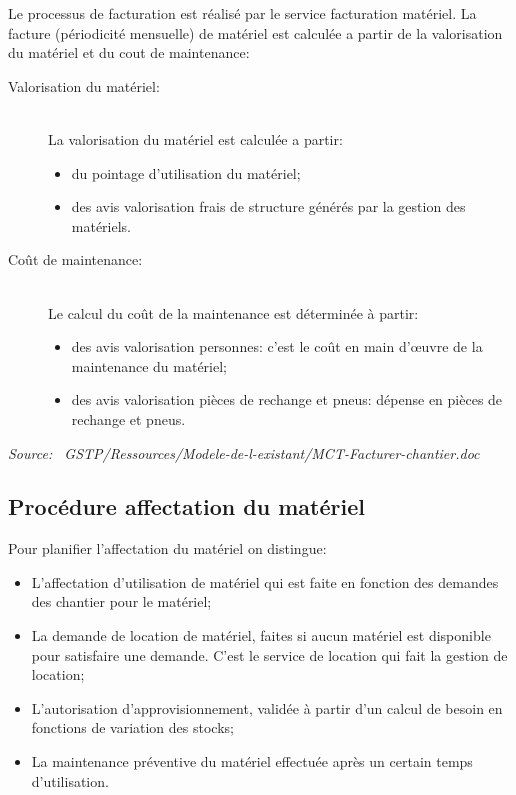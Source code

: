 	Le processus de facturation est réalisé par le service facturation
    matériel. La facture (périodicité mensuelle) de matériel est calculée a
    partir de la valorisation du matériel et du cout de maintenance:

    \begin{description}
	    \item [Valorisation du matériel:]\hfill\\
            La valorisation du matériel est calculée a partir:
		    \begin{itemize}
			    \item du pointage d'utilisation du matériel;
			    \item des avis valorisation frais de structure générés par
                    la gestion des matériels.
		    \end{itemize}	
    
    	\item [Coût de maintenance:]\hfill\\
    		Le calcul du coût de la maintenance est déterminée à partir:
		    \begin{itemize}
			    \item des avis valorisation personnes: c'est le coût en
                    main d'\oe{}uvre de la maintenance du matériel;
			    \item des avis valorisation pièces de rechange et pneus:
                    dépense en pièces de rechange et pneus.
		    \end{itemize}

    \end{description}

    {\sl Source:~{\ttfamily 
        GSTP/Ressources/Modele-de-l-existant/MCT-Facturer-chantier.doc}}

\subsection{Procédure affectation du matériel}

	Pour planifier l'affectation du matériel on distingue:
	\begin{itemize}
		\item L'affectation d'utilisation de matériel qui est faite en
            fonction des demandes des chantier pour le matériel;
		\item La demande de location de matériel, faites si aucun matériel
            est disponible pour satisfaire une demande. C'est le service de
            location qui fait la gestion de location;
		\item L'autorisation d'approvisionnement, validée à partir d'un
            calcul de besoin en fonctions de variation des stocks;
		\item La maintenance préventive du matériel effectuée après un
            certain temps d'utilisation.
	\end{itemize}

